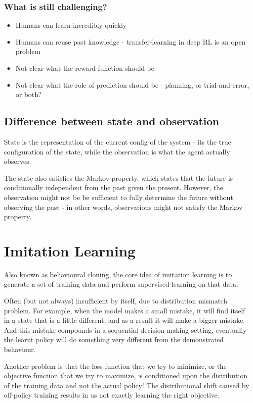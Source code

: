 \documentclass[11pt]{article} %
\begin{document}
\subsubsection{What is still challenging?}
\begin{itemize}
    \item Humans can learn incredibly quickly 
    \item Humans can reuse past knowledge - transfer-learning in deep RL is an open problem
    \item Not clear what the reward function should be
    \item Not clear what the role of prediction should be - planning, or trial-and-error, or both?
\end{itemize}

\subsection{Difference between state and observation}
State is the representation of the current config of the system - its the true configuration of the state,  while the observation is what the agent actually observes. 

The state also satisfies the Markov property, which states that the future is conditionally independent from the past given the present. However, the observation might not be be sufficient to fully determine the future without observing the past - in other words, observations might not satisfy the Markov property. 

\section{Imitation Learning}
Also known as behavioural cloning, the core idea of imitation learning is to generate a set of training data and perform supervised learning on that data.

Often (but not always) insufficient by itself, due to distribution mismatch problem. For example, when the model makes a small mistake, it will find itself in a state that is a little different, and as a result it will make a bigger mistake. And this mistake compounds in a sequential decision-making setting, eventually the learnt policy will do something very different from the demonstrated behaviour.

Another problem is that the loss function that we try to minimize, or the objective function that we try to maximize, is conditioned upon the distribution of the training data and not the actual policy! The distributional shift caused by off-policy training results in us not exactly learning the right objective.
\end{document}
